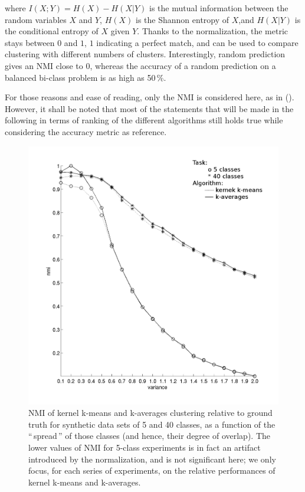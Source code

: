 \documentclass[a4paper,twoside]{article}
\newcommand{\gl}[1]{``\,#1\,''} %
\begin{document}
where $I(X;Y)=H(X)−H(X|Y)$ is the mutual information between the random variables $X$ and $Y$, $H(X)$ is the Shannon entropy of $X$,and $H(X|Y)$ is the conditional entropy of $X$ given $Y$. Thanks to the normalization, the metric stays between $0$ and $1$, $1$ indicating a perfect match, and can be used to compare clustering with different numbers of clusters. Interestingly, random prediction gives an NMI close to $0$, whereas the accuracy of a random prediction on a balanced bi-class problem is as high as 50\,\%.

For those reasons and ease of reading, only the NMI is considered here, as in (\cite{Kulis2008}). However, it shall be noted that most of the statements that will be made in the following in terms of ranking of the different algorithms  still holds true while considering the accuracy metric as reference.

\begin{figure}
\center
\includegraphics[scale=0.4]{figures/synthetic.png} 
\caption{NMI of kernel k-means and k-averages clustering relative to ground truth for synthetic data sets of 5 and 40 classes, as a function of the \gl{spread} of those classes (and hence, their degree of overlap). The lower values of NMI for 5-class experiments is in fact an artifact introduced by the normalization, and is not significant here; we only focus, for each series of experiments, on the relative performances of kernel k-means and k-averages.}
\label{fig:synth_perf}
\end{figure}
\end{document}
